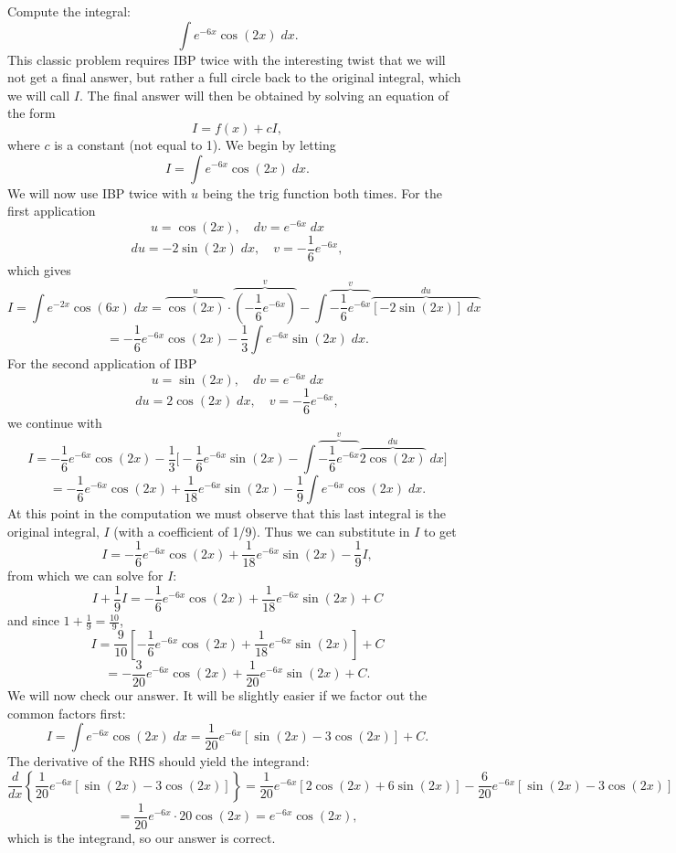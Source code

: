 \documentclass{ximera}
\begin{document}
\begin{example}[example 9]
Compute the integral:
\[
\int e^{-6x}\cos(2x) \; dx.
\]
This classic problem requires IBP twice with the interesting twist that we will not get a final answer, but rather 
a full circle back to the original integral, which we will call $I$.  The final answer will then be obtained by solving an equation 
of the form
\[
I = f(x) + cI,
\]
where $c$ is a constant (not equal to 1).
We begin by letting 
\[
I = \int e^{-6x}\cos(2x) \; dx.
\]
We will now use IBP twice with $u$ being the trig function both times.
For the first application
\[
u = \cos(2x), \quad dv = e^{-6x} \; dx
\]
\[
du = -2\sin(2x) \; dx,  \quad v = -\frac16 e^{-6x},
\]
which gives
\[
I = \int e^{-2x}\cos(6x) \; dx = \overbrace{\cos(2x)}^{u} \cdot 
\overbrace{\left(-\frac16 e^{-6x}\right)}^{v} - \int \overbrace{-\frac16 e^{-6x}}^{v} \overbrace{[-2\sin(2x)] \; dx}^{du}
\]
\[
= -\frac16 e^{-6x}\cos(2x) - \frac13\int  e^{-6x}\sin(2x) \; dx.
\]
For the second application of IBP
\[
u = \sin(2x), \quad dv = e^{-6x} \; dx
\]
\[
du = 2\cos(2x) \; dx,  \quad v = -\frac16 e^{-6x},
\]
we continue with
\[
I = -\frac16 e^{-6x}\cos(2x) - \frac13\Big[ -\frac16 e^{-6x}\sin(2x) - \int  \overbrace{-\frac16 e^{-6x}}^{v} \overbrace{ 2\cos(2x)}^{du} \; dx    \Big]
\]
\[
= -\frac16 e^{-6x}\cos(2x) + \frac{1}{18} e^{-6x}\sin(2x) - \frac19 \int e^{-6x} \cos(2x) \; dx. 
\]
At this point in the computation we must observe that this last integral is the original integral, $I$ (with a coefficient of 1/9). 
Thus we can substitute in $I$ to get
\[
I = -\frac16 e^{-6x}\cos(2x) + \frac{1}{18} e^{-6x}\sin(2x) - \frac19 I,
\]
from which we can solve for $I$:
\[
I + \frac19 I = -\frac16 e^{-6x}\cos(2x) + \frac{1}{18} e^{-6x}\sin(2x) + C
\]
and since $1+\frac19 = \frac{10}{9}$, 
\[
I = \frac{9}{10} \left[-\frac16 e^{-6x}\cos(2x) + \frac{1}{18} e^{-6x}\sin(2x)\right] + C
\]
\[
= -\frac{3}{20} e^{-6x}\cos(2x) + \frac{1}{20} e^{-6x}\sin(2x) + C.
\]
We will now check our answer. It will be slightly easier if we factor out the common factors first:
\[
I = \int e^{-6x}\cos(2x) \; dx = \frac{1}{20} e^{-6x} \left[\sin(2x) - 3\cos(2x)\right] + C.
\]
The derivative of the RHS should yield the integrand:
\[
\frac{d}{dx}\left\{\frac{1}{20} e^{-6x} \left[\sin(2x) - 3\cos(2x)\right]\right\}    = \frac{1}{20} e^{-6x}\left[2\cos(2x) + 6\sin(2x)\right] 
- \frac{6}{20} e^{-6x} \left[\sin(2x) - 3\cos(2x)\right] 
\]
\[
= \frac{1}{20} e^{-6x} \cdot 20\cos(2x) = e^{-6x} \cos(2x),
\]
which is the integrand, so our answer is correct.
\end{example}
\end{document}
